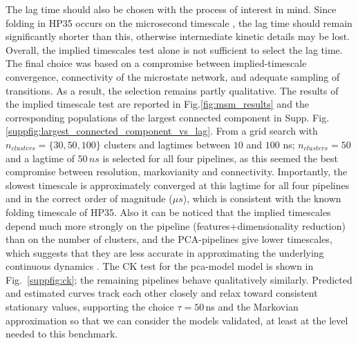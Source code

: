 \documentclass[prl,twocolumn]{revtex4-1}
\begin{document}
The lag time should also be chosen with the process of interest in mind. Since folding in HP35 occurs on the microsecond timescale \cite{Lindorff-Larsen2011}, the lag time should remain significantly shorter than this, otherwise intermediate kinetic details may be lost.
Overall, the implied timescales test alone is not sufficient to select the lag time. The final choice was based on a compromise between implied-timescale convergence, connectivity of the microstate network, and adequate sampling of transitions. As a result, the selection remains partly qualitative.
The results of the implied timescale test are reported in Fig.\ref{fig:msm_results} and the corresponding populations of the largest connected component in Supp. Fig.\ref{suppfig:largest_connected_component_vs_lag}. From a grid search with $n_{clusters}=\{30, 50, 100\}$ clusters and lagtimes between $10$ and $100$ ns; $n_{clusters}=50$  and a lagtime of $50\,ns$ is selected for all four pipelines, as this seemed the best compromise between resolution, markovianity and connectivity.
Importantly, the slowest timescale is approximately converged at this lagtime for all four pipelines and in the correct order of magnitude ($\mu s$), which is consistent with the known folding timescale of HP35. Also it can be noticed that
the implied timescales depend much more strongly on the pipeline (features+dimensionality reduction) than on the number of clusters, and the PCA-pipelines give lower timescales, which suggests that they are less accurate in approximating the underlying continuous dynamics \cite{NoeNuske2013}.
The CK test for the pca-model model is shown in Fig.~\ref{suppfig:ck}; the
remaining pipelines behave qualitatively similarly.
Predicted and estimated curves track each other closely and relax toward consistent stationary values, supporting the choice $\tau = 50$\,ns and the Markovian approximation so that we can consider the models validated, at least at the level needed to this benchmark. 
%
\end{document}
